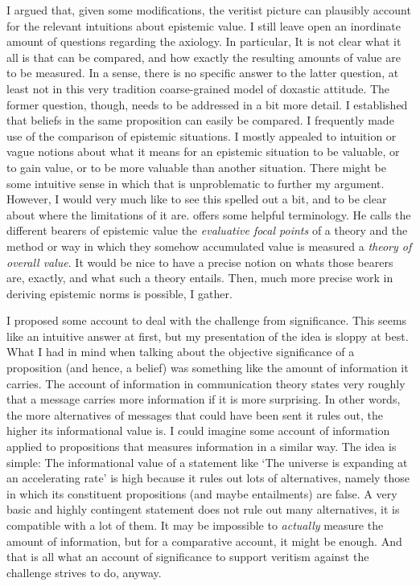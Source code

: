 \documentclass[12pt,numbers=noenddot]{scrartcl}
\begin{document}
I argued that, given some modifications, the veritist picture can plausibly account for the relevant intuitions about epistemic value. I still leave open an inordinate amount of questions regarding the axiology. In particular, It is not clear what it all is that can be compared, and how exactly the resulting amounts of value are to be measured. In a sense, there is no specific answer to the latter question, at least not in this very tradition coarse-grained model of doxastic attitude. The former question, though, needs to be addressed in a bit more detail. I established that beliefs in the same proposition can easily be compared. I frequently made use of the comparison of epistemic situations. I mostly appealed to intuition or vague notions about what it means for an epistemic situation to be valuable, or to gain value, or to be more valuable than another situation. There might be some intuitive sense in which that is unproblematic to further my argument. However, I would very much like to see this spelled out a bit, and to be clear about where the limitations of it are. \textcite{Berker2013-BERETA-2} offers some helpful terminology. He calls the different bearers of epistemic value the \emph{evaluative focal points} of a theory and the method or way in which they somehow accumulated value is measured a \emph{theory of overall value}. It would be nice to have a precise notion on whats those bearers are, exactly, and what such a theory entails. Then, much more precise work in deriving epistemic norms is possible, I gather.

I proposed some account to deal with the challenge from significance. This seems like an intuitive answer at first, but my presentation of the idea is sloppy at best. What I had in mind when talking about the objective significance of a proposition (and hence, a belief) was something like the amount of information it carries. The account of information in communication theory states very roughly that a message carries more information if it is more surprising. In other words, the more alternatives of messages that could have been sent it rules out, the higher its informational value is. I could imagine some account of information applied to propositions that measures information in a similar way. The idea is simple: The informational value of a statement like ‘The universe is expanding at an accelerating rate’ is high because it rules out lots of alternatives, namely those in which its constituent propositions (and maybe entailments) are false. A very basic and highly contingent statement does not rule out many alternatives, it is compatible with a lot of them. It may be impossible to \emph{actually} measure the amount of information, but for a comparative account, it might be enough. And that is all what an account of significance to support veritism against the challenge strives to do, anyway.
\end{document}

